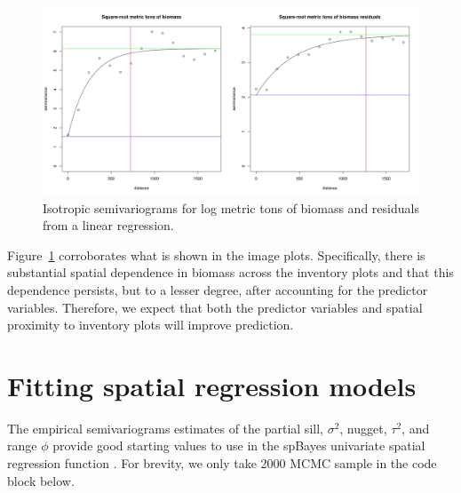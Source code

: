\documentclass{article}
\newcommand{\pkg}[1]{{\normalfont\fontseries{b}\selectfont #1}}
\begin{document}
\begin{figure}
\begin{center}
\includegraphics[width=16cm]{figures/fig-geoRVariog}
\end{center}
\caption{Isotropic semivariograms for log metric tons of biomass and residuals from a linear regression.}
\label{fig:geoRVariog}
\end{figure}

Figure~\ref{fig:geoRVariog} corroborates what is shown in the image plots. Specifically, there is substantial spatial dependence in biomass across the inventory plots and that this dependence persists, but to a lesser degree, after accounting for the predictor variables. Therefore, we expect that both the predictor variables and spatial proximity to inventory plots will improve prediction.

\section{Fitting spatial regression models}
The empirical semivariograms estimates of the partial sill, $\sigma^2$, nugget, $\tau^2$, and range $\phi$ provide good starting values to use in the \pkg{spBayes} univariate spatial regression function \verb@spLM@. For brevity, we only take 2000 MCMC sample in the code block below.
\end{document}
